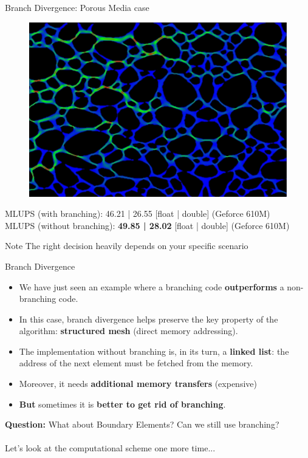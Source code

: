 \documentclass[9pt]{beamer}
\newcommand{\emphasize}[1]{\textbf{\color{red} #1 } }
\begin{document}
\begin{frame}[t]{Branch Divergence: Porous Media case}
\begin{figure}
	\includegraphics[scale=0.18]{images/porous-media-case.jpg}
	\centering
\end{figure}
MLUPS (with branching): 46.21 | 26.55 [float | double] (Geforce 610M)\\

MLUPS (without branching): \emphasize{49.85 | 28.02} [float | double] (Geforce 610M)

\begin{alertblock}{Note}
The right decision heavily depends on your specific scenario
\end{alertblock}
\end{frame}

\begin{frame}[t]{Branch Divergence}
\begin{itemize}
\item We have just seen an example where a branching code \textbf{outperforms} a non-branching code. 

\item In this case, branch divergence helps preserve the key property of the algorithm: \textbf{structured mesh} (direct memory addressing).

\item The implementation without branching is, in its turn, a \textbf{linked list}: the address of the next element must be fetched from the memory.

\item Moreover, it needs \textbf{additional memory transfers} (expensive)

\item \emphasize{But} sometimes it is \textbf{better to get rid of branching}.

\end{itemize}

\textbf{Question:} What about Boundary Elements? Can we still use branching?
\\~\\
Let's look at the computational scheme one more time...
\end{frame}
\end{document}
